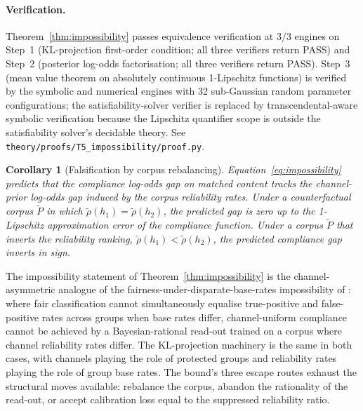 \documentclass[11pt]{article}
\newtheorem{corollary}{Corollary}
\theoremstyle{definition}
\theoremstyle{remark}
\begin{document}
\paragraph{Verification.} Theorem~\ref{thm:impossibility} passes equivalence verification at $3/3$ engines on Step~1 (KL-projection first-order
condition; all three verifiers return PASS) and Step~2 (posterior log-odds factorisation; all three verifiers return PASS). Step~3 (mean value theorem on absolutely continuous 1-Lipschitz functions) is verified by the symbolic and numerical engines with 32 sub-Gaussian random parameter configurations; the satisfiability-solver verifier is replaced by transcendental-aware symbolic verification because the Lipschitz quantifier scope is outside the satisfiability solver's decidable
theory. See \texttt{theory/proofs/T5\_impossibility/proof.py}.

\begin{corollary}[Falsification by corpus rebalancing]
\label{cor:corpus-falsification}
Equation~\eqref{eq:impossibility} predicts that the compliance log-odds gap on
matched content tracks the channel-prior log-odds gap induced by the corpus
reliability rates. Under a counterfactual corpus $\tilde P$ in which
$\tilde\rho(h_1) = \tilde\rho(h_2)$, the predicted gap is zero up to the
1-Lipschitz approximation error of the compliance function. Under a corpus
$\tilde P$ that inverts the reliability ranking, $\tilde\rho(h_1) < \tilde\rho(h_2)$,
the predicted compliance gap inverts in sign.
\end{corollary}

The impossibility statement of Theorem~\ref{thm:impossibility} is the
channel-asymmetric analogue of the fairness-under-disparate-base-rates
impossibility of \cite{hardt2016fairness}: where fair classification cannot
simultaneously equalise true-positive and false-positive rates across groups when
base rates differ, channel-uniform compliance cannot be achieved by a Bayesian-rational
read-out trained on a corpus where channel reliability rates differ. The KL-projection
machinery is the same in both cases, with channels playing the role of protected
groups and reliability rates playing the role of group base rates. The bound's
three escape routes exhaust the structural moves available: rebalance the corpus,
abandon the rationality of the read-out, or accept calibration loss equal to the
suppressed reliability ratio.
\end{document}
